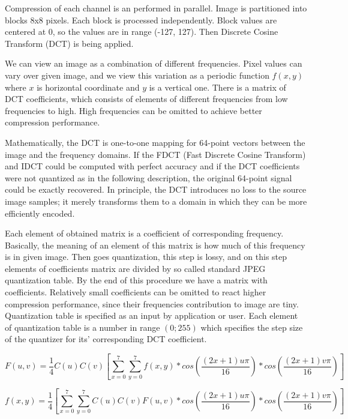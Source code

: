 Compression of each channel is an performed in parallel. Image is partitioned into blocks 8x8 pixels. Each block is processed independently. Block values are centered at 0, so the values are in range (-127, 127). Then Discrete Cosine Transform (DCT) is being applied.

We can view an image as a combination of different frequencies. Pixel values can vary over given image, and we view this variation as a periodic function $f(x, y)$ where $x$ is horizontal coordinate and $y$ is a vertical one. There is a matrix of DCT coefficients, which consists of elements of different frequencies from low frequencies to high. High frequencies can be omitted to achieve better compression performance.

Mathematically, the DCT is one-to-one mapping for 64-point vectors between the image and the frequency domains. If the FDCT (Fast Discrete Cosine Transform) and IDCT could be computed with perfect accuracy and if the DCT coefficients were not quantized as in the following description, the original 64-point signal could be exactly recovered. In principle, the DCT introduces no loss to the source image samples; it merely transforms them to a domain in which they can be more efficiently encoded.

Each element of obtained matrix is a coefficient of corresponding frequency. Basically, the meaning of an element of this matrix is how much of this frequency is in given image. Then goes quantization, this step is lossy, and on this step elements of coefficients matrix are divided by so called standard JPEG quantization table. By the end of this procedure we have a matrix with coefficients. Relatively small coefficients can be omitted to react higher compression performance, since their frequencies contribution to image are tiny. Quantization table is specified as an input by application or user. Each element of quantization table is a number in range $(0; 255)$ which specifies the step size of the quantizer for its' corresponding DCT coefficient.

\begin{equation}
    \label{eq:00}
    F(u,v)=\dfrac{1}{4}C(u)C(v)[\sum_{x=0}^{7}\sum_{y=0}^{7}{f(x,y)*cos(\dfrac{(2x+1)u\pi}{16})*cos(\dfrac{(2x+1)v\pi}{16})}]
\end{equation}

\begin{equation}
    \label{eq:01}
    f(x,y)=\dfrac{1}{4}[\sum_{x=0}^{7}\sum_{y=0}^{7}{C(u)C(v)F(u,v)*cos(\dfrac{(2x+1)u\pi}{16})*cos(\dfrac{(2x+1)v\pi}{16})}]
\end{equation}

